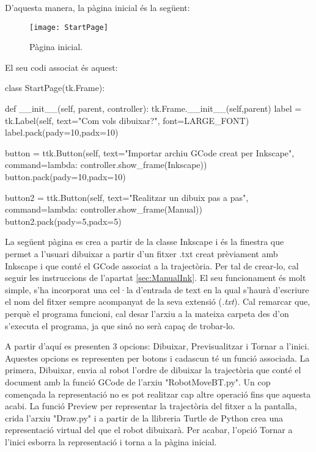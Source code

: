 D’aquesta manera, la pàgina inicial és la següent:

\begin{figure}[H]
	\centering
	\texttt{[image: StartPage]}
	\caption{Pàgina inicial.}
	\label{fig:StartPage}
\end{figure}

El seu codi associat és aquest:

\begin{python}
	class StartPage(tk.Frame):
	
	def __init__(self, parent, controller):
	tk.Frame.__init__(self,parent)
	label = tk.Label(self, text="Com vols dibuixar?", font=LARGE_FONT)
	label.pack(pady=10,padx=10)
	
	button = ttk.Button(self, text="Importar archiu GCode creat per Inkscape",
	command=lambda: controller.show_frame(Inkscape))
	button.pack(pady=10,padx=10)
	
	button2 = ttk.Button(self, text="Realitzar un dibuix pas a pas",
	command=lambda: controller.show_frame(Manual))
	button2.pack(pady=5,padx=5)
\end{python}

La següent pàgina es crea a partir de la classe Inkscape i és la finestra que permet a l’usuari dibuixar a partir d’un fitxer .txt creat prèviament amb Inkscape i que conté el GCode associat a la trajectòria. Per tal de crear-lo, cal seguir les instruccions de l’apartat \ref{sec:ManualInk}. El seu funcionament és molt simple, s’ha incorporat una cel·la d’entrada de text en la qual s’haurà d’escriure el nom del fitxer sempre acompanyat de la seva extensió (\emph{.txt}). Cal remarcar que, perquè el programa funcioni, cal desar l’arxiu a la mateixa carpeta des d’on s’executa el programa, ja que sinó no serà capaç de trobar-lo.

A partir d’aquí es presenten 3 opcions: Dibuixar, Previsualitzar i Tornar a l’inici.  Aquestes opcions es representen per botons i cadascun té un funció associada. La primera, Dibuixar, envia al robot l’ordre de dibuixar la trajectòria que conté el document amb la funció GCode de l’arxiu "RobotMoveBT.py". Un cop començada la representació no es pot realitzar cap altre operació fins que aquesta acabi. La funció Preview per representar la trajectòria del fitxer a la pantalla, crida l’arxiu "Draw.py" i a partir de la llibreria Turtle de Python crea una representació virtual del que el robot dibuixarà. Per acabar, l’opció Tornar a l’inici esborra la representació i torna a la pàgina inicial. 

